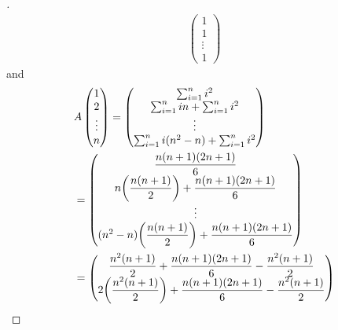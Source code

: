 \begin{proof}[]
\begin{align*}
\begin{pmatrix}
                                                                              1      \\
                                                                              1      \\
                                                                              \vdots \\
                                                                              1
                                                                            \end{pmatrix}
  \end{align*}
  and
  \begin{align*}
     & A \begin{pmatrix}
           1      \\
           2      \\
           \vdots \\
           n
         \end{pmatrix} = \begin{pmatrix}
                           \sum_{i = 1}^n i^2                     \\
                           \sum_{i = 1}^n in + \sum_{i = 1}^n i^2 \\
                           \vdots                                 \\
                           \sum_{i = 1}^n i(n^2 - n) + \sum_{i = 1}^n i^2
                         \end{pmatrix}                                                 \\
     & = \begin{pmatrix}
           \dfrac{n(n + 1)(2n + 1)}{6}                              \\
           n \pa{\dfrac{n(n + 1)}{2}} + \dfrac{n(n + 1)(2n + 1)}{6} \\
           \vdots                                                   \\
           (n^2 - n) \pa{\dfrac{n(n + 1)}{2}} + \dfrac{n(n + 1)(2n + 1)}{6}
         \end{pmatrix}                                           \\
     & = \begin{pmatrix}
           \dfrac{n^2(n + 1)}{2} + \dfrac{n(n + 1)(2n + 1)}{6} - \dfrac{n^2(n + 1)}{2}        \\
           2 \pa{\dfrac{n^2(n + 1)}{2}} + \dfrac{n(n + 1)(2n + 1)}{6} - \dfrac{n^2(n + 1)}{2} \\

\end{pmatrix}
\end{align*}
\end{proof}
